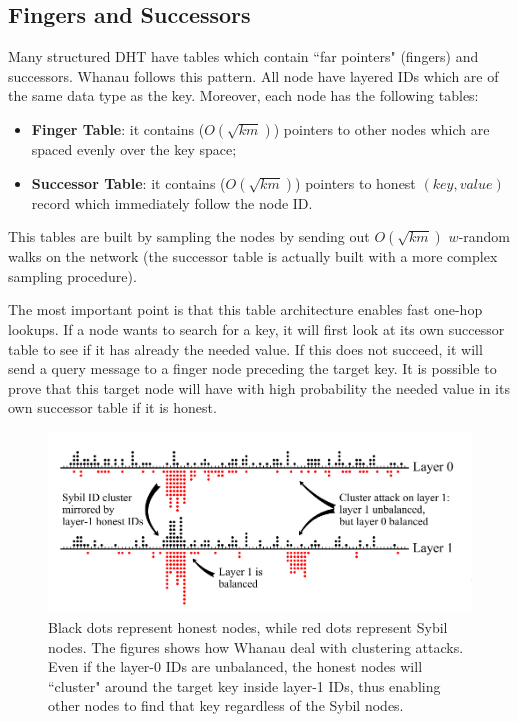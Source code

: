 \subsection{Fingers and Successors} Many structured DHT have tables which contain ``far pointers" (fingers) and successors. Whanau follows this pattern. All node have layered IDs which are of the same data type as the key. Moreover, each node has the following tables:
\begin{itemize}
    \item \textbf{Finger Table}: it contains ($O(\sqrt{km})$) pointers to other nodes which are spaced evenly over the key space;
    \item \textbf{Successor Table}: it contains ($O(\sqrt{km})$) pointers to honest $(key,value)$ record which immediately follow the node ID. 
\end{itemize}
This tables are built by sampling the nodes by sending out $O(\sqrt{km})$ $w$-random walks on the network (the successor table is actually built with a more complex sampling procedure).

The most important point is that this table architecture enables fast one-hop lookups. If a node wants to search for a key, it will first look at its own successor table to see if it has already the needed value. If this does not succeed, it will send a query message to a finger node preceding the target key. It is possible to prove that this target node will have with high probability the needed value in its own successor table if it is honest.

\begin{figure}[t]
    \centering
    \includegraphics[width=\linewidth]{layers.png}
    \caption{Black dots represent honest nodes, while red dots represent Sybil nodes. The figures shows how Whanau deal with clustering attacks. Even if the layer-0 IDs are unbalanced, the honest nodes will ``cluster" around the target key inside layer-1 IDs, thus enabling other nodes to find that key regardless of the Sybil nodes.}
    \label{fig:layers}
\end{figure}

